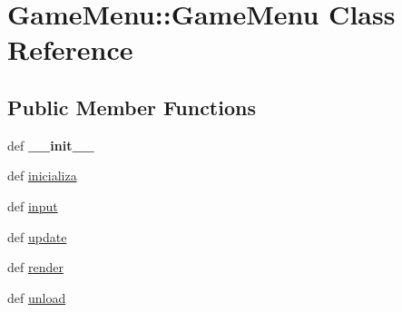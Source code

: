 \hypertarget{class_game_menu_1_1_game_menu}{
\section{GameMenu::GameMenu Class Reference}
\label{class_game_menu_1_1_game_menu}
}
\subsection*{Public Member Functions}
\begin{CompactItemize}
\item 
\hypertarget{class_game_menu_1_1_game_menu_fbfcc5a32f5bf17595c40e1dde6c94c2}{
def \textbf{\_\-\_\-init\_\-\_\-}}
\label{class_game_menu_1_1_game_menu_fbfcc5a32f5bf17595c40e1dde6c94c2}

\item 
def \hyperlink{class_game_menu_1_1_game_menu_5161d405aa508fdc1e2a81d7513fd75e}{inicializa}
\item 
def \hyperlink{class_game_menu_1_1_game_menu_124d43216383f2fb6959cb6afdb0f080}{input}
\item 
def \hyperlink{class_game_menu_1_1_game_menu_cc5129439eb900b90f5244edd26cc94d}{update}
\item 
def \hyperlink{class_game_menu_1_1_game_menu_a39d753b347e12a65ac3500beebdc3d8}{render}
\item 
def \hyperlink{class_game_menu_1_1_game_menu_bf73225ae1d5154228866a5a5ebb3306}{unload}
\end{CompactItemize}
